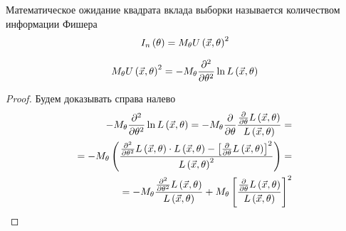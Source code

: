 \begin{definition}
    Математическое ожидание квадрата вклада выборки называется
    количеством информации Фишера
    $$I_n\left(\theta\right)=
        M_{\theta} U\left( \vec{x},\theta \right)^2$$
\end{definition}
\begin{remark}
    $$M_{\theta} U\left( \vec{x},\theta \right)^2
        =-M_{\theta} 
            \frac{\partial^2}{\partial\theta^2}
            \ln{L\left( \vec{x},\theta \right)}$$
\end{remark}
\begin{proof}
    Будем доказывать справа налево
    \begin{align*}
        -M_{\theta} 
            \frac{\partial^2}{\partial\theta^2}
            \ln{L\left( \vec{x},\theta \right)}=
        -M_{\theta} 
            \frac{\partial}{\partial\theta}
            \frac{\frac{\partial}{\partial\theta}L\left(\vec{x},\theta\right)}
                {L\left(\vec{x},\theta\right)}=\\
        =-M_{\theta} 
            \left(
            \frac{\frac{\partial^2}{\partial\theta^2}
                L\left(\vec{x},\theta\right)\cdot L\left(\vec{x},\theta\right)-
                    \left[\frac{\partial}{\partial\theta}
                        L\left(\vec{x},\theta\right)\right]^2
                }
                {L\left(\vec{x},\theta\right)^2}
                \right)=\\
        =-M_{\theta} 
            \frac{\frac{\partial^2}{\partial\theta^2}
                L\left(\vec{x},\theta\right)}
                {L\left(\vec{x},\theta\right)}
            +M_{\theta} 
                \left[\frac{\frac{\partial}{\partial\theta}
                    L\left(\vec{x},\theta\right)}
                    {L\left(\vec{x},\theta\right)}\right]^2
    \end{align*}
    

\end{proof}
